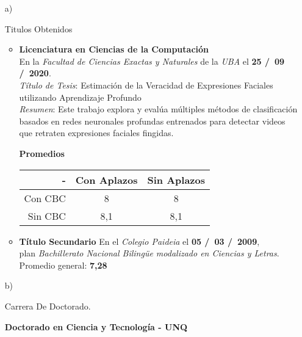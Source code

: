 \begin{enumerate}[leftmargin=0.8cm]

  \item[a)]{Titulos Obtenidos

    \begin{itemize}[leftmargin=0.2cm]

      \item {
        \textbf{Licenciatura en Ciencias de la Computación} \\
        En la \emph{Facultad de Ciencias Exactas y Naturales} de la \emph{UBA} el \textbf{25 \slash \ 09 \slash \ 2020}.
        \\ \emph{Título de Tesis}: Estimación de la Veracidad de Expresiones Faciales utilizando Aprendizaje Profundo
        \\ \emph{Resumen}: Este trabajo explora y evalúa múltiples métodos de clasificación basados en redes neuronales profundas entrenados para detectar videos que retraten expresiones faciales fingidas.
        \ifdefined\JTP
        \begin{center}
        \textbf{Promedios}

        \begin{tabular}{|r|c|c|}
        \hline
        - & Con Aplazos & Sin Aplazos \\
        \hline
        Con CBC & 8 & 8 \\
        \hline
        Sin CBC & 8,1 & 8,1 \\
        \hline
        \end{tabular}
        \end{center}
        \fi
      }

      \item {
        \textbf{Título Secundario}
        En el \emph{Colegio Paideia} el \textbf{05 \slash \ 03 \slash \ 2009}, \\
        plan \emph{Bachillerato Nacional Bilingüe modalizado en Ciencias y Letras}. \\
        Promedio general: \textbf{7,28}
      }

    \end{itemize}

  }

  \item[b)]{Carrera De Doctorado.

    \textbf{Doctorado en Ciencia y Tecnología - UNQ}

}
\end{enumerate}
